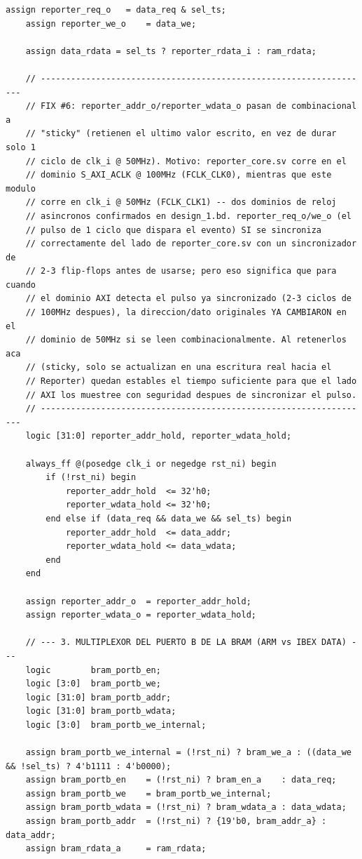 \begin{lstlisting}[style=verilogstyle, basicstyle=\ttfamily\footnotesize, caption={Codigo fuente del subsistema \texttt{ibex\_bram\_subsystem.sv}}, label={code:ibex_bram_subsystem}]
    assign reporter_req_o   = data_req & sel_ts;
    assign reporter_we_o    = data_we;

    assign data_rdata = sel_ts ? reporter_rdata_i : ram_rdata;

    // ------------------------------------------------------------------
    // FIX #6: reporter_addr_o/reporter_wdata_o pasan de combinacional a
    // "sticky" (retienen el ultimo valor escrito, en vez de durar solo 1
    // ciclo de clk_i @ 50MHz). Motivo: reporter_core.sv corre en el
    // dominio S_AXI_ACLK @ 100MHz (FCLK_CLK0), mientras que este modulo
    // corre en clk_i @ 50MHz (FCLK_CLK1) -- dos dominios de reloj
    // asincronos confirmados en design_1.bd. reporter_req_o/we_o (el
    // pulso de 1 ciclo que dispara el evento) SI se sincroniza
    // correctamente del lado de reporter_core.sv con un sincronizador de
    // 2-3 flip-flops antes de usarse; pero eso significa que para cuando
    // el dominio AXI detecta el pulso ya sincronizado (2-3 ciclos de
    // 100MHz despues), la direccion/dato originales YA CAMBIARON en el
    // dominio de 50MHz si se leen combinacionalmente. Al retenerlos aca
    // (sticky, solo se actualizan en una escritura real hacia el
    // Reporter) quedan estables el tiempo suficiente para que el lado
    // AXI los muestree con seguridad despues de sincronizar el pulso.
    // ------------------------------------------------------------------
    logic [31:0] reporter_addr_hold, reporter_wdata_hold;

    always_ff @(posedge clk_i or negedge rst_ni) begin
        if (!rst_ni) begin
            reporter_addr_hold  <= 32'h0;
            reporter_wdata_hold <= 32'h0;
        end else if (data_req && data_we && sel_ts) begin
            reporter_addr_hold  <= data_addr;
            reporter_wdata_hold <= data_wdata;
        end
    end

    assign reporter_addr_o  = reporter_addr_hold;
    assign reporter_wdata_o = reporter_wdata_hold;

    // --- 3. MULTIPLEXOR DEL PUERTO B DE LA BRAM (ARM vs IBEX DATA) ---
    logic        bram_portb_en;
    logic [3:0]  bram_portb_we;
    logic [31:0] bram_portb_addr;
    logic [31:0] bram_portb_wdata;
    logic [3:0]  bram_portb_we_internal;

    assign bram_portb_we_internal = (!rst_ni) ? bram_we_a : ((data_we && !sel_ts) ? 4'b1111 : 4'b0000);
    assign bram_portb_en    = (!rst_ni) ? bram_en_a    : data_req;
    assign bram_portb_we    = bram_portb_we_internal;
    assign bram_portb_wdata = (!rst_ni) ? bram_wdata_a : data_wdata;
    assign bram_portb_addr  = (!rst_ni) ? {19'b0, bram_addr_a} : data_addr;
    assign bram_rdata_a     = ram_rdata;


\end{lstlisting}
